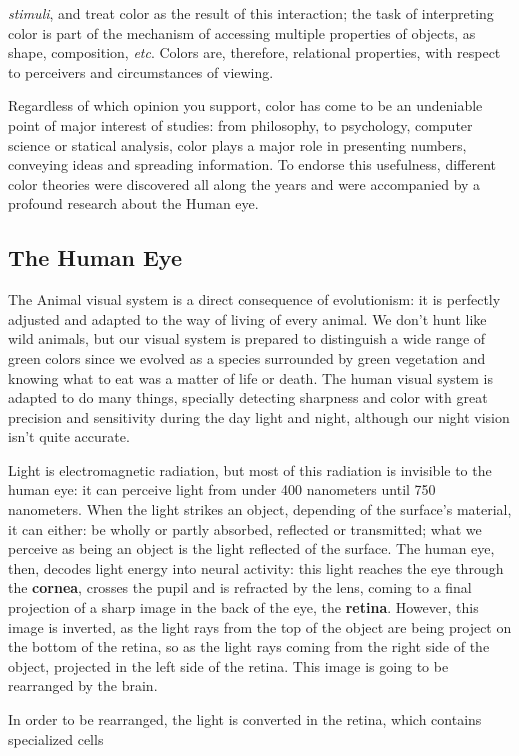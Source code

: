 \emph{stimuli}, and treat color as the result of this interaction; the task of interpreting color is part of
the mechanism of accessing multiple properties of objects, as shape, composition, \emph{etc}.
Colors are, therefore, relational properties, with respect to perceivers and circumstances of viewing. \par
Regardless of which opinion you support, color has come to be an undeniable point of major interest of studies:
from philosophy, to psychology, computer science or statical analysis, color plays a major role in presenting
numbers, conveying ideas and spreading information. To endorse this usefulness, different color theories were
discovered all along the years and were accompanied by a profound research about the Human eye.
%
\subsection{The Human Eye}
\label{sec:humaneye}
%
The Animal visual system is a direct consequence of evolutionism: it is perfectly adjusted and adapted
to the way of living of every animal. We don’t hunt like wild animals, but our visual system is
prepared to distinguish a wide range of green colors since we evolved as a species surrounded by green
vegetation and knowing what to eat was a matter of life or death. The human visual system is adapted
to do many things, specially detecting sharpness and color with great precision and sensitivity during
the day light and night, although our night vision isn’t quite accurate. \par
%
Light is electromagnetic radiation, but most of this radiation is invisible to the human eye: it can
perceive light from under 400 nanometers until 750 nanometers.
When the light strikes an object, depending of the surface’s material, it can either: be wholly or partly
absorbed, reflected or transmitted; what we perceive as being an object is the light reflected of the
surface. The human eye, then, decodes light energy into neural activity:
this light reaches the eye through the \textbf{cornea}, crosses the pupil and is refracted by the lens, coming to a final
projection of a sharp image in the back of the eye, the \textbf{retina}. However, this image is
inverted, as the light rays from the top of the object are being project on the bottom of the retina,
so as the light rays coming from the right side of the object, projected in the left side of the
retina. This image is going to be rearranged by the brain.  \par
%
In order to be rearranged, the light is converted in the retina, which contains specialized cells
